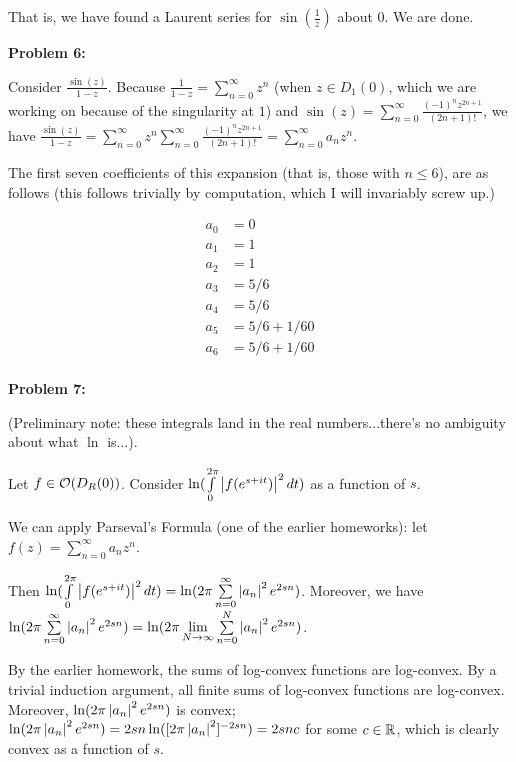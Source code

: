 \documentclass[a4paper,12pt]{article}
\begin{document}
That is, we have found a Laurent series for $\sin(\frac{1}{z})$ about $0$. We are done.

\shunt

{\bf Problem 6:}

Consider $\frac{\sin(z)}{1-z}$. Because $\frac{1}{1-z} = \sum\limits_{n=0}^\infty z^n$ (when $z \in D_1(0)$, which we are working on because of the singularity at $1$) and $\sin(z) = \sum\limits_{n=0}^\infty \frac{(-1)^n z^{2n+1}}{(2n+1)!}$, we have $\frac{\sin(z)}{1-z} = \sum\limits_{n=0}^\infty z^n \sum\limits_{n=0}^\infty \frac{(-1)^n z^{2n+1}}{(2n+1)!} = \sum\limits_{n=0}^\infty a_nz^n$.

The first seven coefficients of this expansion (that is, those with $n \leq 6$), are as follows (this follows trivially by computation, which I will invariably screw up.)

\begin{align*}
a_0 &= 0\\
a_1 &= 1\\
a_2 &= 1\\
a_3 &= 5/6\\
a_4 &= 5/6\\
a_5 &= 5/6 + 1/60\\
a_6 &= 5/6 + 1/60\\
\end{align*}

\shunt

{\bf Problem 7:}

(Preliminary note: these integrals land in the real numbers...there's no ambiguity about what $\ln$ is...).

Let $f \in \mathcal{O}(D_R(0))$. Consider $\ln(\int\limits_0^{2\pi} \left\lvert f(e^{s+it}) \right\rvert^2 dt)$ as a function of $s$.

We can apply Parseval's Formula (one of the earlier homeworks): let $f(z) = \sum\limits_{n=0}^\infty a_n z^n$.

Then $\ln( \int\limits_0^{2\pi} \left\lvert f(e^{s+it}) \right\rvert^2 dt) = \ln(2\pi \sum\limits_{n=0}^\infty \left\lvert a_n \right\rvert^2 e^{2sn})$. Moreover, we have $\ln(2\pi \sum\limits_{n=0}^\infty \left\lvert a_n \right\rvert^2 e^{2sn}) =  \ln(2\pi \lim\limits_{N \to \infty}\sum\limits_{n=0}^N \left\lvert a_n \right\rvert^2 e^{2sn})$. 

By the earlier homework, the sums of log-convex functions are log-convex. By a trivial induction argument, all finite sums of log-convex functions are log-convex. Moreover, $\ln(2\pi \left\lvert a_n \right\rvert^2 e^{2sn})$ is convex; $\ln(2\pi \left\lvert a_n \right\rvert^2 e^{2sn}) = 2sn \ln([2\pi\left\lvert a_n \right\rvert^2]^{-2sn}) = 2snc$ for some $c \in \mathbb{R}$, which is clearly convex as a function of $s$. %
\end{document}
